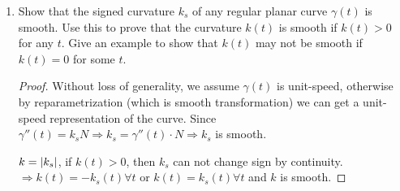 \documentclass{article}
\DeclarePairedDelimiter\abs{\lvert}{\rvert}
\begin{document}
\courseheader
{}
\begin{enumerate}
\item Show that the signed curvature $k_s$ of any regular planar curve $\gamma(t)$ is smooth. Use this to prove that the curvature $k(t)$ is smooth if $k(t)>0$ for any $t$. Give an example to show that $k(t)$ may not be smooth if $k(t)=0$ for some $t$.
\begin{proof}
Without loss of generality, we assume $\gamma(t)$ is unit-speed, otherwise by reparametrization (which is smooth transformation) we can get a unit-speed representation of the curve.
Since $\gamma''(t) = k_s N \Rightarrow k_s = \gamma''(t) \cdot N \Rightarrow k_s $ is smooth.

$k=\abs{k_s}$, if $k(t)>0$, then $k_s$ can not change sign by continuity.$\Rightarrow k(t)=-k_s(t)\forall t$ or $k(t)=k_s(t)\forall t$ and $k$ is smooth.


\end{proof}
\end{enumerate}
\end{document}

